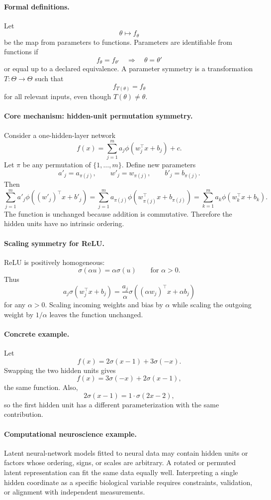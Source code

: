 \paragraph{Formal definitions.}
Let
\[
\theta\mapsto f_\theta
\]
be the map from parameters to functions. Parameters are identifiable from functions if
\[
f_\theta=f_{\theta'} \quad \Longrightarrow \quad \theta=\theta'
\]
or equal up to a declared equivalence. A parameter symmetry is a transformation \(T:\Theta\to\Theta\) such that
\[
\boxed{
f_{T(\theta)}=f_\theta
}
\]
for all relevant inputs, even though \(T(\theta)\neq\theta\).

\paragraph{Core mechanism: hidden-unit permutation symmetry.}
Consider a one-hidden-layer network
\[
f(x)=\sum_{j=1}^m a_j\phi(w_j^\top x+b_j)+c.
\]
Let \(\pi\) be any permutation of \(\{1,\ldots,m\}\). Define new parameters
\[
a'_j=a_{\pi(j)},\qquad w'_j=w_{\pi(j)},\qquad b'_j=b_{\pi(j)}.
\]
Then
\[
\sum_{j=1}^m a'_j\phi((w'_j)^\top x+b'_j)
=\sum_{j=1}^m a_{\pi(j)}\phi(w_{\pi(j)}^\top x+b_{\pi(j)})
=\sum_{k=1}^m a_k\phi(w_k^\top x+b_k).
\]
The function is unchanged because addition is commutative. Therefore the hidden units have no intrinsic ordering.

\paragraph{Scaling symmetry for ReLU.}
ReLU is positively homogeneous:
\[
\sigma(\alpha u)=\alpha\sigma(u)\qquad \text{for }\alpha>0.
\]
Thus
\[
a_j\sigma(w_j^\top x+b_j)
=\frac{a_j}{\alpha}\sigma((\alpha w_j)^\top x+\alpha b_j)
\]
for any \(\alpha>0\). Scaling incoming weights and bias by \(\alpha\) while scaling the outgoing weight by \(1/\alpha\) leaves the function unchanged.

\paragraph{Concrete example.}
Let
\[
f(x)=2\sigma(x-1)+3\sigma(-x).
\]
Swapping the two hidden units gives
\[
f(x)=3\sigma(-x)+2\sigma(x-1),
\]
the same function. Also,
\[
2\sigma(x-1)=1\cdot\sigma(2x-2),
\]
so the first hidden unit has a different parameterization with the same contribution.

\paragraph{Computational neuroscience example.}
Latent neural-network models fitted to neural data may contain hidden units or factors whose ordering, signs, or scales are arbitrary. A rotated or permuted latent representation can fit the same data equally well. Interpreting a single hidden coordinate as a specific biological variable requires constraints, validation, or alignment with independent measurements.

